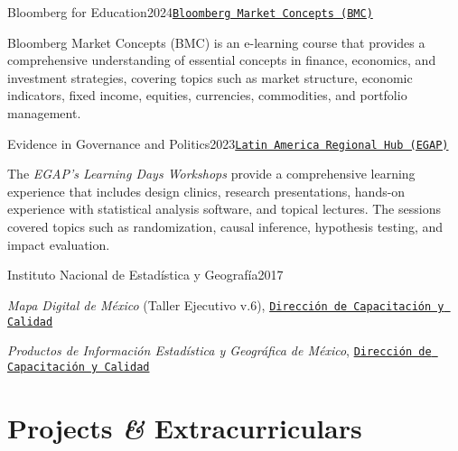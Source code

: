 \documentclass[letter]{resume}
\begin{document}
\begin{content}

\begin{position}{Bloomberg for Education}{2024}{\normalfont\href{https://portal.bloombergforeducation.com/courses}{\texttt{Bloomberg Market Concepts (BMC)}}}{}{}
\item Bloomberg Market Concepts (BMC) is an e-learning course that provides a comprehensive understanding of essential concepts in finance, economics, and investment strategies, covering topics such as market structure, economic indicators, fixed income, equities, currencies, commodities, and portfolio management.
\end{position}

\begin{position}{Evidence in Governance and Politics}{2023}{\normalfont\href{https://egap.org/project/learning-days-13-latin-america-regional-hub-workshop/}{\texttt{Latin America Regional Hub (EGAP)}}}{}{}
  \item The \emph{EGAP's Learning Days Workshops} provide a comprehensive learning experience that includes design clinics, research presentations, hands-on experience with statistical analysis software, and topical lectures. The sessions covered topics such as randomization, causal inference, hypothesis testing, and impact evaluation.
\end{position}

\begin{position}{Instituto Nacional de Estadística y Geografía}{2017}{}{}{}
  \item \emph{Mapa Digital de México} (Taller Ejecutivo v.6), {\normalfont\href{https://drive.google.com/file/d/11P-V5IOrVxSAdumvZkqc6cNErlPHsWbA/view?usp=sharing}{\texttt{Dirección de Capacitación y Calidad}}}
  \item \emph{Productos de Información Estadística y Geográfica de México}, {\normalfont\href{https://drive.google.com/file/d/175VzjC148czXa4mLOryoo6QfAnEpCx_z/view?usp=sharing}{\texttt{Dirección de Capacitación y Calidad}}}
\end{position}

\end{content}


\section{Projects \textbf{\em\&} Extracurriculars} 
\end{document}
